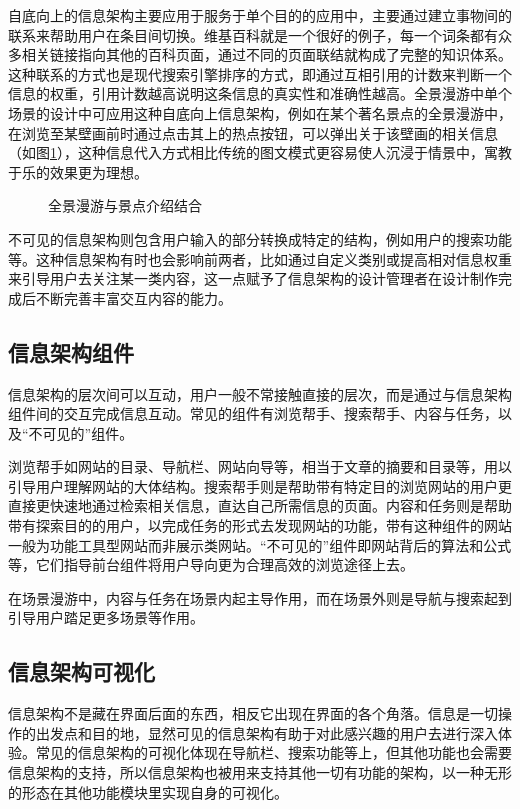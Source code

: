 自底向上的信息架构主要应用于服务于单个目的的应用中，主要通过建立事物间的联系来帮助用户在条目间切换。维基百科就是一个很好的例子，每一个词条都有众多相关链接指向其他的百科页面，通过不同的页面联结就构成了完整的知识体系。这种联系的方式也是现代搜索引擎排序的方式，即通过互相引用的计数来判断一个信息的权重，引用计数越高说明这条信息的真实性和准确性越高。全景漫游中单个场景的设计中可应用这种自底向上信息架构，例如在某个著名景点的全景漫游中，在浏览至某壁画前时通过点击其上的热点按钮，可以弹出关于该壁画的相关信息（如图\ref{fig:dunhuang}），这种信息代入方式相比传统的图文模式更容易使人沉浸于情景中，寓教于乐的效果更为理想。

\begin{figure}[htp]
\centering
{}
\caption{全景漫游与景点介绍结合}
\label{fig:dunhuang}
\end{figure}

不可见的信息架构则包含用户输入的部分转换成特定的结构，例如用户的搜索功能等。这种信息架构有时也会影响前两者，比如通过自定义类别或提高相对信息权重来引导用户去关注某一类内容，这一点赋予了信息架构的设计管理者在设计制作完成后不断完善丰富交互内容的能力。

\subsection{信息架构组件}
信息架构的层次间可以互动，用户一般不常接触直接的层次，而是通过与信息架构组件间的交互完成信息互动。常见的组件有浏览帮手、搜索帮手、内容与任务，以及“不可见的”组件。

浏览帮手如网站的目录、导航栏、网站向导等，相当于文章的摘要和目录等，用以引导用户理解网站的大体结构。搜索帮手则是帮助带有特定目的浏览网站的用户更直接更快速地通过检索相关信息，直达自己所需信息的页面。内容和任务则是帮助带有探索目的的用户，以完成任务的形式去发现网站的功能，带有这种组件的网站一般为功能工具型网站而非展示类网站。“不可见的”组件即网站背后的算法和公式等，它们指导前台组件将用户导向更为合理高效的浏览途径上去。

在场景漫游中，内容与任务在场景内起主导作用，而在场景外则是导航与搜索起到引导用户踏足更多场景等作用。

\subsection{信息架构可视化}
信息架构不是藏在界面后面的东西，相反它出现在界面的各个角落。信息是一切操作的出发点和目的地，显然可见的信息架构有助于对此感兴趣的用户去进行深入体验。常见的信息架构的可视化体现在导航栏、搜索功能等上，但其他功能也会需要信息架构的支持，所以信息架构也被用来支持其他一切有功能的架构，以一种无形的形态在其他功能模块里实现自身的可视化。

